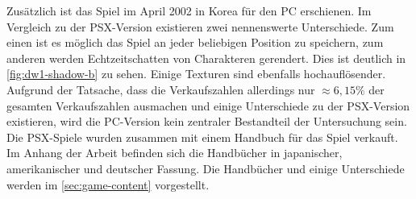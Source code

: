 Zusätzlich ist das Spiel im April 2002 in Korea für den PC erschienen\cite{korea-multi}.
Im Vergleich zu der \ac{PSX}-Version existieren zwei nennenswerte Unterschiede.
Zum einen ist es möglich das Spiel an jeder beliebigen Position zu speichern, zum anderen werden Echtzeitschatten von Charakteren gerendert.
Dies ist deutlich in \autoref{fig:dw1-shadow-b} zu sehen.
Einige Texturen sind ebenfalls hochauflösender.\\

Aufgrund der Tatsache, dass die Verkaufszahlen allerdings nur $\approx 6{,}15\%$ der gesamten Verkaufszahlen ausmachen und einige Unterschiede zu der \ac{PSX}-Version existieren, wird die PC-Version kein zentraler Bestandteil der Untersuchung sein\cite{vgchartz}.
Die \ac{PSX}-Spiele wurden zusammen mit einem Handbuch für das Spiel verkauft.
Im Anhang der Arbeit befinden sich die Handbücher in japanischer, amerikanischer und deutscher Fassung.
Die Handbücher und einige Unterschiede werden im \autoref{sec:game-content} vorgestellt.\\